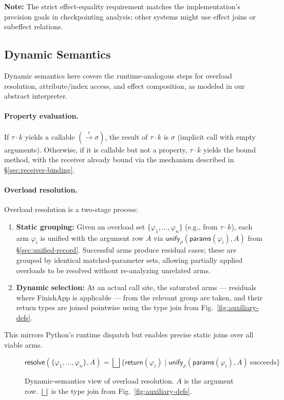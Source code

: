\noindent\textbf{Note:} The strict effect-equality requirement matches the implementation’s precision goals in checkpointing analysis; other systems might use effect joins or subeffect relations.

\subsection{Dynamic Semantics}

Dynamic semantics here covers the runtime-analogous steps for overload resolution, attribute/index access, and effect composition, as modeled in our abstract interpreter.

\paragraph{Property evaluation.}
If $\tau \cdot k$ yields a callable $(\xrightarrow{\epsilon} \sigma)$, 
the result of $\tau \cdot k$ is $\sigma$ (implicit call with empty arguments).  
Otherwise, if it is callable but not a property, $\tau \cdot k$ yields the bound method, with the receiver already bound via the mechanism described in \S\ref{sec:receiver-binding}.

\paragraph{Overload resolution.}
\label{sec:overload-resolution}
Overload resolution is a two-stage process:
\begin{enumerate}
\item \textbf{Static grouping:}  
  Given an overload set $\{\varphi_1, \ldots, \varphi_n\}$ (e.g., from $\tau \cdot k$), each arm $\varphi_i$ is unified with the argument row $A$ via  
  $\mathsf{unify}_{\rho}(\mathsf{params}(\varphi_i), A)$ from \S\ref{sec:unified-record}.  
  Successful arms produce residual cases; these are grouped by identical matched-parameter sets, allowing partially applied overloads to be resolved without re-analyzing unrelated arms.
\item \textbf{Dynamic selection:}  
  At an actual call site, the saturated arms --- residuals where \textsf{FinishApp} is applicable --- from the relevant group are taken, and their return types are joined pointwise using the type join from Fig.~\ref{fig:auxiliary-defs}.
\end{enumerate}
This mirrors Python’s runtime dispatch but enables precise static joins over all viable arms.

\begin{figure*}[t]
\centering
\[
\mathsf{resolve}(\{\varphi_1, \ldots, \varphi_n\}, A) =
\bigsqcup\{\mathsf{return}(\varphi_i) \mid \mathsf{unify}_{\rho}(\mathsf{params}(\varphi_i), A) \ \text{succeeds}\}
\]
\caption{Dynamic-semantics view of overload resolution. $A$ is the argument row. $\bigsqcup$ is the type join from Fig.~\ref{fig:auxiliary-defs}.}
\label{fig:dynamic-semantics}
\end{figure*}

